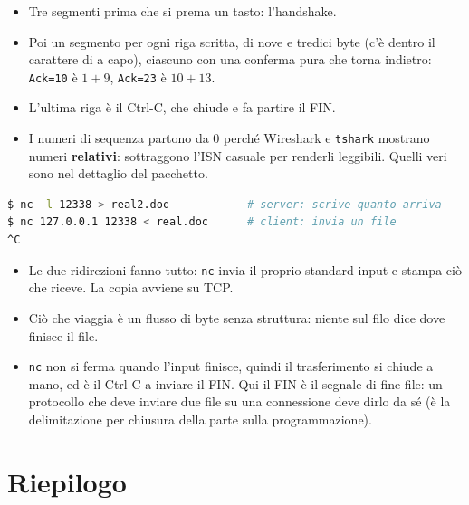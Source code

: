 \begin{itemize}
    \item Tre segmenti prima che si prema un tasto: l'handshake.
    \item Poi un segmento per ogni riga scritta, di nove e tredici byte (c'è dentro il carattere di a capo), ciascuno con una
          conferma pura che torna indietro: \texttt{Ack=10} è $1 + 9$, \texttt{Ack=23} è $10 + 13$.
    \item L'ultima riga è il Ctrl-C, che chiude e fa partire il FIN.
    \item I numeri di sequenza partono da 0 perché Wireshark e \texttt{tshark} mostrano numeri \textbf{relativi}: sottraggono
          l'ISN casuale per renderli leggibili. Quelli veri sono nel dettaglio del pacchetto.
\end{itemize}

\begin{lstlisting}[language=bash, title={La stessa connessione, con un file}]
$ nc -l 12338 > real2.doc            # server: scrive quanto arriva
$ nc 127.0.0.1 12338 < real.doc      # client: invia un file
^C
\end{lstlisting}

\begin{itemize}
    \item Le due ridirezioni fanno tutto: \texttt{nc} invia il proprio standard input e stampa ciò che riceve. La copia
          avviene su TCP.
    \item Ciò che viaggia è un flusso di byte senza struttura: niente sul filo dice dove finisce il file.
    \item \texttt{nc} non si ferma quando l'input finisce, quindi il trasferimento si chiude a mano, ed è il Ctrl-C a inviare
          il FIN. Qui il FIN è il segnale di fine file: un protocollo che deve inviare due file su una connessione deve dirlo
          da sé (è la delimitazione per chiusura della parte sulla programmazione).
\end{itemize}

\section{Riepilogo}

